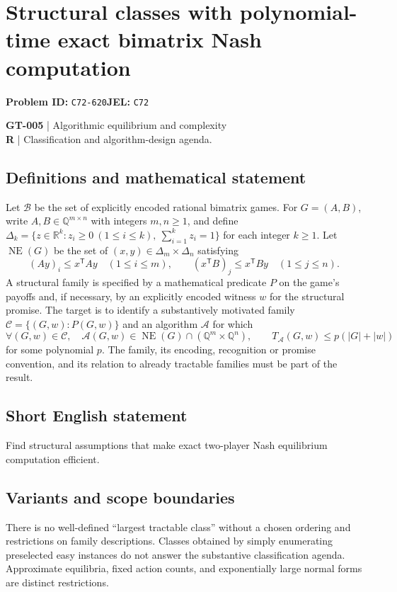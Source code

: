 \documentclass[11pt,a4paper]{article}
\newcommand{\R}{\mathbb R}
\begin{document}
\section*{Structural classes with polynomial-time exact bimatrix Nash computation}
\textbf{Problem ID:} \texttt{C72-620}\quad \textbf{JEL:} \texttt{C72}\par
\label{problem:OP-0135}
\label{game:GT-005}
{\sffamily\small\color{muted}
\textbf{GT-005} | Algorithmic equilibrium and complexity\\
\textbf{R} | Classification and algorithm-design agenda.
\par}
\subsection*{Definitions and mathematical statement}
Let $\mathcal B$ be the set of explicitly encoded rational bimatrix games. For $G=(A,B)$, write $A,B\in\mathbb Q^{m\times n}$ with integers $m,n\geq1$, and define $\Delta_k=\{z\in\R^k:z_i\geq0\ (1\leq i\leq k),\ \sum_{i=1}^k z_i=1\}$ for each integer $k\geq1$. Let $\operatorname{NE}(G)$ be the set of $(x,y)\in\Delta_m\times\Delta_n$ satisfying
\[
 (Ay)_i\leq x^{\mathsf T}Ay\quad(1\leq i\leq m),\qquad
 (x^{\mathsf T}B)_j\leq x^{\mathsf T}By\quad(1\leq j\leq n).
\]
A structural family is specified by a mathematical predicate $P$ on the game's payoffs and, if necessary, by an explicitly encoded witness $w$ for the structural promise. The target is to identify a substantively motivated family $\mathcal C=\{(G,w):P(G,w)\}$ and an algorithm $\mathcal A$ for which
\[
 \forall(G,w)\in\mathcal C,\quad
 \mathcal A(G,w)\in\operatorname{NE}(G)\cap(\mathbb Q^m\times\mathbb Q^n),\qquad
 T_{\mathcal A}(G,w)\leq p(|G|+|w|)
\]
for some polynomial $p$. The family, its encoding, recognition or promise convention, and its relation to already tractable families must be part of the result.
\subsection*{Short English statement}
Find structural assumptions that make exact two-player Nash equilibrium computation efficient.
\subsection*{Variants and scope boundaries}
There is no well-defined ``largest tractable class'' without a chosen ordering and restrictions on family descriptions. Classes obtained by simply enumerating preselected easy instances do not answer the substantive classification agenda. Approximate equilibria, fixed action counts, and exponentially large normal forms are distinct restrictions.
\end{document}
